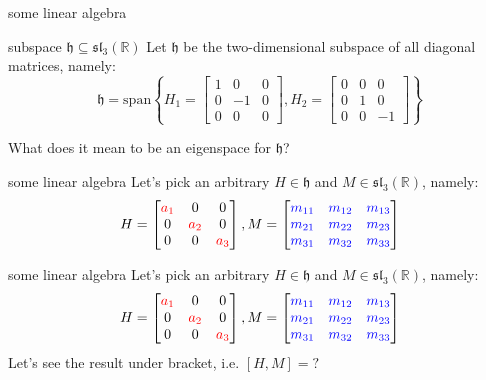 \documentclass{beamer}
\newcommand{\R}{\mathbb{R}}
\begin{document}
\begin{frame}{some linear algebra}
	\begin{defn}{subspace $\mathfrak{h} \subseteq \mathfrak{sl}_3(\R)$}{}
		Let  $\mathfrak{h}$ be the two-dimensional subspace of all diagonal matrices, namely:  \[
			\mathfrak{h} = \text{span}{\left\{ H_1 = \begin{bmatrix} 1 & 0 &0 \\ 0 & -1 & 0 \\ 0 &0 &0 \end{bmatrix}, H_2 = \begin{bmatrix} 0 &0 &0 \\ 0 &1&0 \\ 0&0&-1 \end{bmatrix}   \right\} }
		\] 
	\end{defn}
	What does it mean to be an eigenspace for $\mathfrak{h}$?
\end{frame}

\begin{frame}{some linear algebra}
	Let's pick an arbitrary $H \in \mathfrak{h}$ and $M \in \mathfrak{sl}_3(\R)$, namely: \[
		H = \def\a{\color{red}a} \begin{bmatrix} \a_1 & 0 & 0 \\ 0 & \a_2 &0 \\ 0 &0 &\a_3 \end{bmatrix}, M = \def\m{\color{blue}m} \begin{bmatrix} \m_{11} & \m_{12} & \m_{13} \\ \m_{21} & \m_{22} & \m_{23} \\ \m_{31} & \m_{32} & \m_{33} \end{bmatrix} 
	\] 
\end{frame}


\begin{frame}{some linear algebra}
	Let's pick an arbitrary $H \in \mathfrak{h}$ and $M \in \mathfrak{sl}_3(\R)$, namely: \[
		H = \def\a{\color{red}a} \begin{bmatrix} \a_1 & 0 & 0 \\ 0 & \a_2 &0 \\ 0 &0 &\a_3 \end{bmatrix}, M = \def\m{\color{blue}m} \begin{bmatrix} \m_{11} & \m_{12} & \m_{13} \\ \m_{21} & \m_{22} & \m_{23} \\ \m_{31} & \m_{32} & \m_{33} \end{bmatrix} 
	\]
	Let's see the result under bracket, i.e. $[H,M] = ?$
\end{frame}
\end{document}
